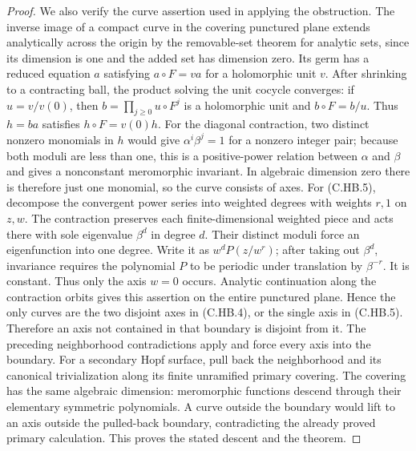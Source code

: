 \begin{proof}
We also verify the curve assertion
used in applying the obstruction.
The inverse image of a compact
curve in the covering punctured
plane extends analytically across
the origin by the removable-set
theorem for analytic sets, since
its dimension is one and the
added set has dimension zero.
Its germ has a reduced equation
$a$ satisfying $a\circ F=v a$
for a holomorphic unit $v$.
After shrinking to a contracting
ball, the product solving the
unit cocycle converges: if
$u=v/v(0)$, then
$b=\prod_{j\ge0}u\circ F^j$
is a holomorphic unit and
$b\circ F=b/u$.
Thus $h=ba$ satisfies
$h\circ F=v(0)h$.
For the diagonal contraction,
two distinct nonzero monomials
in $h$ would give
$\alpha^i\beta^j=1$ for a
nonzero integer pair; because
both moduli are less than one,
this is a positive-power
relation between $\alpha$
and $\beta$ and gives a
nonconstant meromorphic
invariant. In algebraic
dimension zero there is
therefore just one monomial,
so the curve consists of
axes. For (C.HB.5), decompose
the convergent power series
into weighted degrees with
weights $r,1$ on $z,w$.
The contraction preserves
each finite-dimensional
weighted piece and acts
there with sole eigenvalue
$\beta^d$ in degree $d$.
Their distinct moduli force
an eigenfunction into one
degree. Write it as
$w^dP(z/w^r)$; after taking
out $\beta^d$, invariance
requires the polynomial
$P$ to be periodic under
translation by $\beta^{-r}$.
It is constant. Thus only
the axis $w=0$ occurs.
Analytic continuation along
the contraction orbits
gives this assertion on
the entire punctured plane.
Hence the only curves
are the two disjoint axes
in (C.HB.4), or the single
axis in (C.HB.5).
Therefore an axis not
contained in that boundary
is disjoint from it. The
preceding neighborhood
contradictions apply and
force every axis into the
boundary. For a secondary
Hopf surface, pull back
the neighborhood and its
canonical trivialization
along its finite unramified
primary covering. The
covering has the same
algebraic dimension:
meromorphic functions
descend through their
elementary symmetric
polynomials. A curve
outside the boundary
would lift to an axis
outside the pulled-back
boundary, contradicting
the already proved
primary calculation.
This proves the stated
descent and the theorem.
\end{proof}
